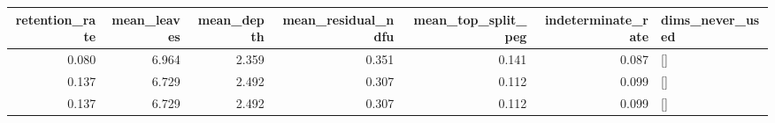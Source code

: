 \begin{tabular}{rrrrrrl}
\toprule
retention_rate & mean_leaves & mean_depth & mean_residual_ndfu & mean_top_split_peg & indeterminate_rate & dims_never_used \\
\midrule
0.080 & 6.964 & 2.359 & 0.351 & 0.141 & 0.087 & [] \\
0.137 & 6.729 & 2.492 & 0.307 & 0.112 & 0.099 & [] \\
0.137 & 6.729 & 2.492 & 0.307 & 0.112 & 0.099 & [] \\
\bottomrule
\end{tabular}
